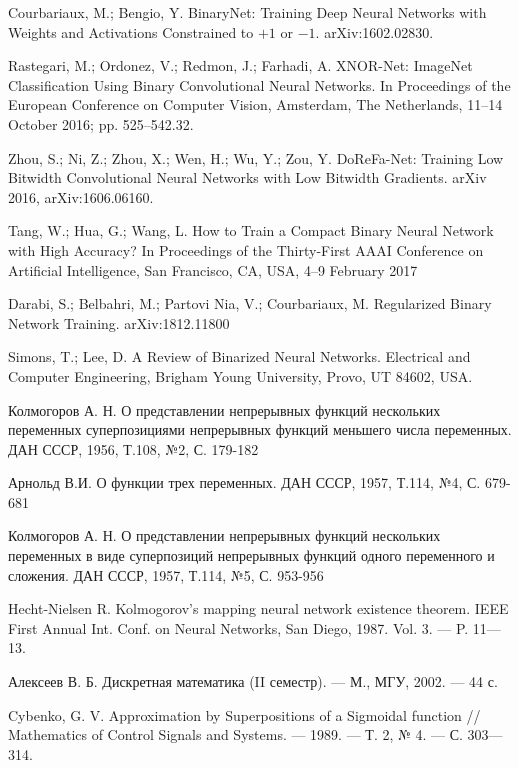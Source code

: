 \begin{thebibliography}{99}

 Courbariaux, M.; Bengio, Y. BinaryNet: Training Deep Neural Networks with Weights and Activations Constrained to $+1$ or $-1$. arXiv:1602.02830.
    
 Rastegari, M.; Ordonez, V.; Redmon, J.; Farhadi, A. XNOR-Net: ImageNet Classification Using Binary Convolutional Neural Networks. In Proceedings of the European Conference on Computer Vision, Amsterdam, The Netherlands, 11–14 October 2016; pp. 525–542.32.
    
 Zhou, S.; Ni, Z.; Zhou, X.; Wen, H.; Wu, Y.; Zou, Y. DoReFa-Net: Training Low Bitwidth Convolutional Neural Networks with Low Bitwidth Gradients. arXiv 2016, arXiv:1606.06160.
    
 Tang, W.; Hua, G.; Wang, L. How to Train a Compact Binary Neural Network with High Accuracy? In Proceedings of the Thirty-First AAAI Conference on Artificial Intelligence, San Francisco, CA, USA, 4–9 February 2017
    
 Darabi, S.; Belbahri, M.; Partovi Nia, V.; Courbariaux, M. Regularized Binary Network Training. arXiv:1812.11800
    
 Simons, T.; Lee, D. A Review of Binarized Neural Networks. Electrical and Computer Engineering, Brigham Young University, Provo, UT 84602, USA.
    
 Колмогоров А. Н. О представлении непрерывных функций нескольких переменных суперпозициями непрерывных функций меньшего числа переменных. ДАН СССР, 1956, Т.108, №2, С. 179-182
    
 Арнольд В.И. О функции трех переменных. ДАН СССР, 1957, Т.114, №4, С. 679-681
    
 Колмогоров А. Н. О представлении непрерывных функций нескольких переменных в виде суперпозиций непрерывных функций одного переменного и сложения. ДАН СССР, 1957, Т.114, №5, С. 953-956
    
 Hecht-Nielsen R. Kolmogorov’s mapping neural network existence theorem. IEEE First Annual Int. Conf. on Neural Networks, San Diego, 1987. Vol. 3. — P. 11—13.

 Алексеев В. Б. Дискретная математика (II семестр). — М., МГУ, 2002. — 44 с.

 Cybenko, G. V. Approximation by Superpositions of a Sigmoidal function // Mathematics of Control Signals and Systems. — 1989. — Т. 2, № 4. — С. 303—314.

\end{thebibliography}